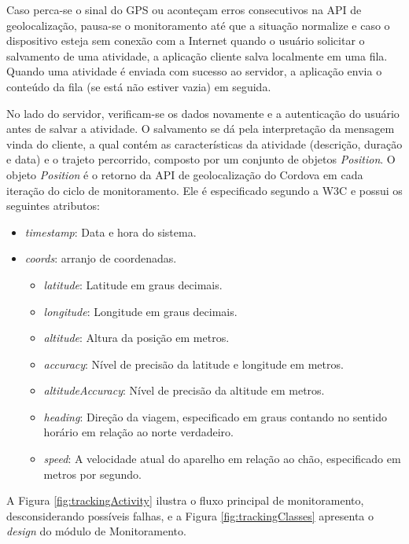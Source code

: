 \par
Caso perca-se o sinal do GPS ou aconteçam erros consecutivos na API de geolocalização, pausa-se o monitoramento até que a situação normalize e caso o dispositivo esteja sem conexão com a Internet quando o usuário solicitar o salvamento de uma atividade, a aplicação cliente salva localmente em uma fila. Quando uma atividade é enviada com sucesso ao servidor, a aplicação envia o conteúdo da fila (se está não estiver vazia) em seguida.
\par
No lado do servidor, verificam-se os dados novamente e a autenticação do usuário antes de salvar a atividade. O salvamento se dá pela interpretação da mensagem vinda do cliente, a qual contém as características da atividade (descrição, duração e data) e o trajeto percorrido, composto por um conjunto de objetos \textit{Position}. O objeto \textit{Position} é o retorno da API de geolocalização do Cordova em cada iteração do ciclo de monitoramento. Ele é especificado segundo a W3C e possui os seguintes atributos:
\begin{itemize}
\item \textit{timestamp}: Data e hora do sistema.
\item \textit{coords}: arranjo de coordenadas.
    \begin{itemize}
        \item \textit{latitude}: Latitude em graus decimais.
        \item \textit{longitude}: Longitude em graus decimais.
        \item \textit{altitude}: Altura da posição em metros.
        \item \textit{accuracy}: Nível de precisão da latitude e longitude em metros.
        \item \textit{altitudeAccuracy}: Nível de precisão da altitude em metros. 
        \item \textit{heading}: Direção da viagem, especificado em graus contando no sentido horário em relação ao norte verdadeiro.
        \item \textit{speed}: A velocidade atual do aparelho em relação ao chão, especificado em metros por segundo.
    \end{itemize}
\end{itemize}

\par
A Figura \ref{fig:trackingActivity} ilustra o fluxo principal de monitoramento, desconsiderando possíveis falhas, e a Figura \ref{fig:trackingClasses} apresenta o \textit{design} do módulo de Monitoramento.

